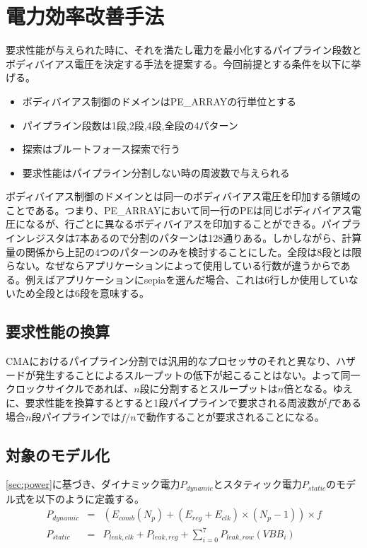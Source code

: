 {\section{電力効率改善手法}
\label{sec:optimization_method}


要求性能が与えられた時に、それを満たし電力を最小化するパイプライン段数とボディバイアス電圧を決定する手法を提案する。今回前提とする条件を以下に挙げる。
\begin{itemize}
\item ボディバイアス制御のドメインはPE\_ARRAYの行単位とする
\item パイプライン段数は1段,2段,4段,全段の4パターン
\item 探索はブルートフォース探索で行う
\item 要求性能はパイプライン分割しない時の周波数で与えられる
\end{itemize}

ボディバイアス制御のドメインとは同一のボディバイアス電圧を印加する領域のことである。つまり、PE\_ARRAYにおいて同一行のPEは同じボディバイアス電圧になるが、行ごとに異なるボディバイアスを印加することができる。パイプラインレジスタは7本あるので分割のパターンは128通りある。しかしながら、計算量の関係から上記の4つのパターンのみを検討することにした。全段は8段とは限らない。なぜならアプリケーションによって使用している行数が違うからである。例えばアプリケーションにsepiaを選んだ場合、これは6行しか使用していないため全段とは6段を意味する。

\subsection{要求性能の換算}
\label{subsec:performance_conversion}
CMAにおけるパイプライン分割では汎用的なプロセッサのそれと異なり、ハザードが発生することによるスループットの低下が起こることはない。よって同一クロックサイクルであれば、$n$段に分割するとスループットは$n$倍となる。ゆえに、要求性能を換算するとすると1段パイプラインで要求される周波数が$f$である場合$n$段パイプラインでは$f/n$で動作することが要求されることになる。

\subsection{対象のモデル化}
\label{subsec:modeling}
\ref{sec:power}に基づき、ダイナミック電力$P_{dynamic}$とスタティック電力$P_{static}$のモデル式を以下のように定義する。
\begin{eqnarray}
P_{dynamic} &=& \left(E_{comb}(N_p) + (E_{reg} + E_{clk}) \times (N_p - 1) \right) \times f\\
\label{eq:dynamic}
P_{static} &=& P_{leak,clk} + P_{leak,reg} + \sum_{i=0}^{7}P_{leak,row}(VBB_i)
\label{eq:static}
\end{eqnarray}

}
